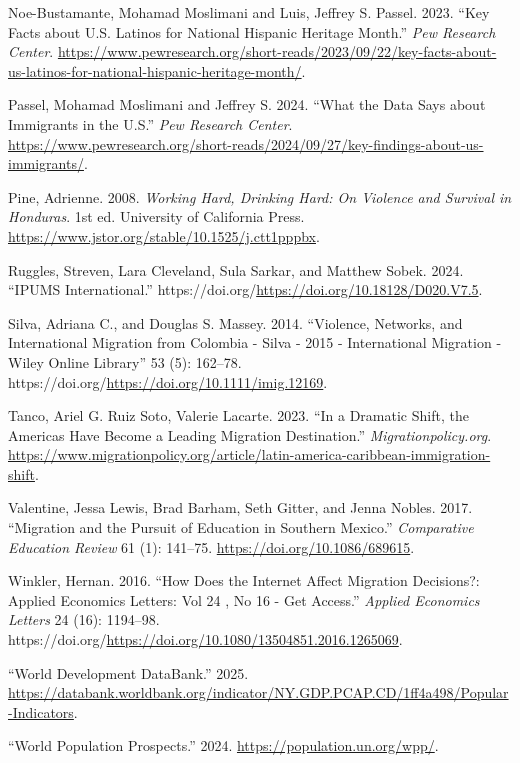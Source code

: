 \documentclass[
]{article}
\newlength{\cslhangindent}
\newenvironment{CSLReferences}[2] %
 {\begin{list}{}{%
  \setlength{\itemindent}{0pt}
  \setlength{\leftmargin}{0pt}
  \setlength{\parsep}{0pt}
  \ifodd #1
   \setlength{\leftmargin}{\cslhangindent}
   \setlength{\itemindent}{-1\cslhangindent}
  \fi
  \setlength{\itemsep}{#2\baselineskip}}}
 {\end{list}}
\begin{document}
\begin{CSLReferences}{1}{0}
Noe-Bustamante, Mohamad Moslimani and Luis, Jeffrey S. Passel. 2023.
{``Key Facts about {U}.{S}. {Latinos} for {National} {Hispanic}
{Heritage} {Month}.''} \emph{Pew Research Center}.
\url{https://www.pewresearch.org/short-reads/2023/09/22/key-facts-about-us-latinos-for-national-hispanic-heritage-month/}.

Passel, Mohamad Moslimani and Jeffrey S. 2024. {``What the Data Says
about Immigrants in the {U}.{S}.''} \emph{Pew Research Center}.
\url{https://www.pewresearch.org/short-reads/2024/09/27/key-findings-about-us-immigrants/}.

Pine, Adrienne. 2008. \emph{Working {Hard}, {Drinking} {Hard}: {On}
{Violence} and {Survival} in {Honduras}}. 1st ed. University of
California Press.
\url{https://www.jstor.org/stable/10.1525/j.ctt1pppbx}.

Ruggles, Streven, Lara Cleveland, Sula Sarkar, and Matthew Sobek. 2024.
{``{IPUMS} {International}.''}
https://doi.org/\url{https://doi.org/10.18128/D020.V7.5}.

Silva, Adriana C., and Douglas S. Massey. 2014. {``Violence, {Networks},
and {International} {Migration} from {Colombia} - {Silva} - 2015 -
{International} {Migration} - {Wiley} {Online} {Library}''} 53 (5):
162--78. https://doi.org/\url{https://doi.org/10.1111/imig.12169}.

Tanco, Ariel G. Ruiz Soto, Valerie Lacarte. 2023. {``In a {Dramatic}
{Shift}, the {Americas} {Have} {Become} a {Leading} {Migration}
{Destination}.''} \emph{Migrationpolicy.org}.
\url{https://www.migrationpolicy.org/article/latin-america-caribbean-immigration-shift}.

Valentine, Jessa Lewis, Brad Barham, Seth Gitter, and Jenna Nobles.
2017. {``Migration and the {Pursuit} of {Education} in {Southern}
{Mexico}.''} \emph{Comparative Education Review} 61 (1): 141--75.
\url{https://doi.org/10.1086/689615}.

Winkler, Hernan. 2016. {``How Does the Internet Affect Migration
Decisions?: {Applied} {Economics} {Letters}: {Vol} 24 , {No} 16 - {Get}
{Access}.''} \emph{Applied Economics Letters} 24 (16): 1194--98.
https://doi.org/\url{https://doi.org/10.1080/13504851.2016.1265069}.

{``World {Development} {DataBank}.''} 2025.
\url{https://databank.worldbank.org/indicator/NY.GDP.PCAP.CD/1ff4a498/Popular-Indicators}.

{``World {Population} {Prospects}.''} 2024.
\url{https://population.un.org/wpp/}.

\end{CSLReferences}
\end{document}
